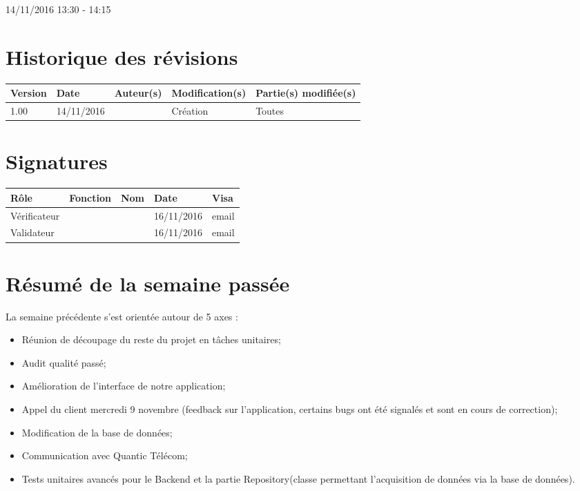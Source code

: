 \documentclass [a4paper] {article}
\begin{document}
14/11/2016			 				%
\hfill   
\hfill 	 13:30 - 14:15				%


\section*{Historique des révisions}
\begin{center}
			\begin{tabular}{| p{2.5cm} | p{3cm} | p{3cm} | p{3cm} | p{3.5cm} |}
				\hline
				\rowcolor{Gray}
				Version & Date & Auteur(s) & Modification(s) & Partie(s) modifiée(s)		 \\
				\hline
				1.00 & 14/11/2016 & \Kafui & Création & Toutes \\
				\hline			
			\end{tabular}
		\end{center}

\section*{Signatures}

		\begin{center}
			\begin{tabular}{| p{2.5cm} | p{4cm} | p{3cm} | p{3cm} | p{2.5cm} |}
				\hline
				\rowcolor{Gray}
				Rôle & Fonction & Nom & Date & Visa		 \\
				\hline
				Vérificateur & \RGC & \Melissa & 16/11/2016 & email \\[30pt]
				\hline
				Validateur & \CP & \Pierre &  16/11/2016 & email \\[30pt]	
				\hline
			\end{tabular}
		\end{center}

\section{Résumé de la semaine passée}
La semaine précédente s'est orientée autour de 5 axes :  
\begin{itemize}
	\item Réunion de découpage du reste du projet en tâches unitaires;
	\item Audit qualité passé;
	\item Amélioration de l'interface de notre application;
	\item Appel du client mercredi 9 novembre (feedback sur l'application, certains bugs ont été signalés et sont en cours de correction);
	\item Modification de la base de données;
	\item Communication avec Quantic Télécom;
	\item Tests unitaires avancés pour le Backend et la partie Repository(classe permettant l'acquisition de données via la base de données).
\end{itemize} 
\end{document}
